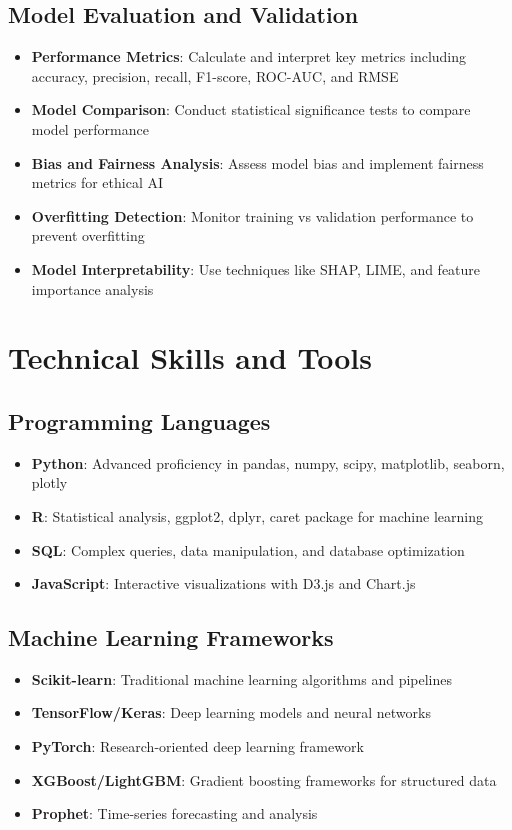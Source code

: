 \documentclass[11pt,a4paper]{article}
\begin{document}
\subsection{Model Evaluation and Validation}
\begin{itemize}[leftmargin=*]
    \item \textbf{Performance Metrics}: Calculate and interpret key metrics including accuracy, precision, recall, F1-score, ROC-AUC, and RMSE
    \item \textbf{Model Comparison}: Conduct statistical significance tests to compare model performance
    \item \textbf{Bias and Fairness Analysis}: Assess model bias and implement fairness metrics for ethical AI
    \item \textbf{Overfitting Detection}: Monitor training vs validation performance to prevent overfitting
    \item \textbf{Model Interpretability}: Use techniques like SHAP, LIME, and feature importance analysis
\end{itemize}

\section{Technical Skills and Tools}

\subsection{Programming Languages}
\begin{itemize}[leftmargin=*]
    \item \textbf{Python}: Advanced proficiency in pandas, numpy, scipy, matplotlib, seaborn, plotly
    \item \textbf{R}: Statistical analysis, ggplot2, dplyr, caret package for machine learning
    \item \textbf{SQL}: Complex queries, data manipulation, and database optimization
    \item \textbf{JavaScript}: Interactive visualizations with D3.js and Chart.js
\end{itemize}

\subsection{Machine Learning Frameworks}
\begin{itemize}[leftmargin=*]
    \item \textbf{Scikit-learn}: Traditional machine learning algorithms and pipelines
    \item \textbf{TensorFlow/Keras}: Deep learning models and neural networks
    \item \textbf{PyTorch}: Research-oriented deep learning framework
    \item \textbf{XGBoost/LightGBM}: Gradient boosting frameworks for structured data
    \item \textbf{Prophet}: Time-series forecasting and analysis
\end{itemize}
\end{document}
